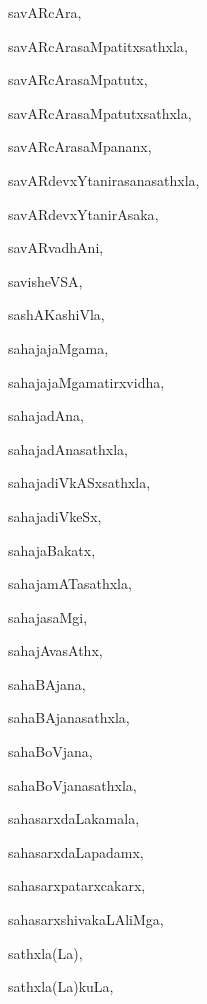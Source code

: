 \begin{multicols}{2}
{savARcAra}, \pageref{savARcAra}

{savARcArasaMpatitxsathxla}, \pageref{savARcArasaMpatitxsathxla}

{savARcArasaMpatutx}, \pageref{savARcArasaMpatutx}

{savARcArasaMpatutxsathxla}, \pageref{savARcArasaMpatutxsathxla}

{savARcArasaMpananx}, \pageref{savARcArasaMpananx}

{savARdevxYtanirasanasathxla}, \pageref{savARdevxYtanirasanasathxla}

{savARdevxYtanirAsaka}, \pageref{savARdevxYtanirAsaka}

{savARvadhAni}, \pageref{savARvadhAni}

{savisheVSA}, \pageref{savisheVSA}

{sashAKashiVla}, \pageref{sashAKashiVla}

{sahajajaMgama}, \pageref{sahajajaMgama}

{sahajajaMgamatirxvidha}, \pageref{sahajajaMgamatirxvidha}

{sahajadAna}, \pageref{sahajadAna}

{sahajadAnasathxla}, \pageref{sahajadAnasathxla}

{sahajadiVkASxsathxla}, \pageref{sahajadiVkASxsathxla}

{sahajadiVkeSx}, \pageref{sahajadiVkeSx}

{sahajaBakatx}, \pageref{sahajaBakatx}

{sahajamATasathxla}, \pageref{sahajamATasathxla}

{sahajasaMgi}, \pageref{sahajasaMgi}

{sahajAvasAthx}, \pageref{sahajAvasAthx}

{sahaBAjana}, \pageref{sahaBAjana}

{sahaBAjanasathxla}, \pageref{sahaBAjanasathxla}

{sahaBoVjana}, \pageref{sahaBoVjana}

{sahaBoVjanasathxla}, \pageref{sahaBoVjanasathxla}

{sahasarxdaLakamala}, \pageref{sahasarxdaLakamala}

{sahasarxdaLapadamx}, \pageref{sahasarxdaLapadamx}

{sahasarxpatarxcakarx}, \pageref{sahasarxpatarxcakarx}

{sahasarxshivakaLAliMga}, \pageref{sahasarxshivakaLAliMga}

{sathxla(La)}, \pageref{sathxlaLa}

{sathxla(La)kuLa}, \pageref{sathxlaLakuLa}


\end{multicols}
